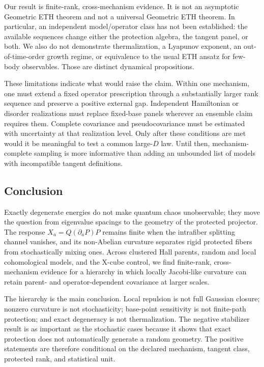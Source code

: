 Our result is finite-rank, cross-mechanism evidence.  It is not an asymptotic
Geometric ETH theorem and not a universal Geometric ETH theorem.  In
particular, an independent model/operator class has not been established:
the available sequences change either the protection algebra, the tangent
panel, or both.  We also do not demonstrate thermalization, a Lyapunov
exponent, an out-of-time-order growth regime, or equivalence to the usual ETH
ansatz for few-body observables.  Those are distinct dynamical propositions.

These limitations indicate what would raise the claim.  Within one mechanism,
one must extend a fixed operator prescription through a substantially larger
rank sequence and preserve a positive external gap.  Independent Hamiltonian
or disorder realizations must replace fixed-base panels wherever an ensemble
claim requires them.  Complete covariance and pseudocovariance must be
estimated with uncertainty at that realization level.  Only after these
conditions are met would it be meaningful to test a common large-$D$ law.
Until then, mechanism-complete sampling is more informative than adding an
unbounded list of models with incompatible tangent definitions.

\subsection{Conclusion}
\label{sec:conclusion}

Exactly degenerate energies do not make quantum chaos unobservable; they move
the question from eigenvalue spacings to the geometry of the protected
projector.  The response $X_a=Q(\partial_aP)P$ remains finite when the
intrafiber splitting channel vanishes, and its non-Abelian curvature separates
rigid protected fibers from stochastically mixing ones.  Across clustered Hall
parents, random and local cohomological models, and the X-cube control, we find
finite-rank, cross-mechanism evidence for a hierarchy in which locally
Jacobi-like curvature can retain parent- and operator-dependent covariance at
larger scales.

The hierarchy is the main conclusion.  Local repulsion is not full Gaussian
closure; nonzero curvature is not stochasticity; base-point sensitivity is not
finite-path protection; and exact degeneracy is not thermalization.  The
negative stabilizer result is as important as the stochastic cases because it
shows that exact protection does not automatically generate a random geometry.
The positive statements are therefore conditional on the declared mechanism,
tangent class, protected rank, and statistical unit.

